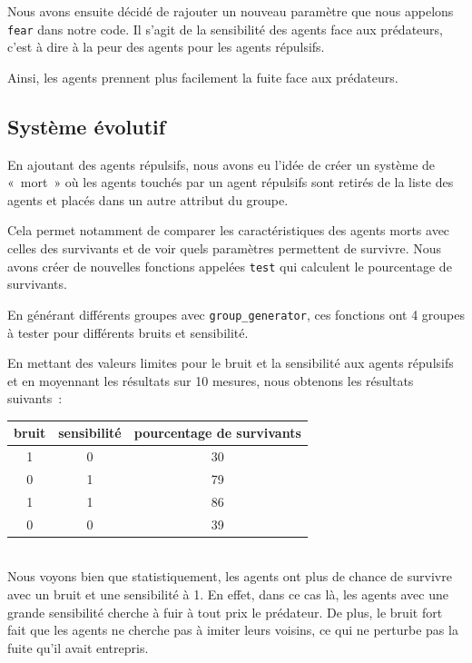 \documentclass[french, a4paper, 12pt, openany]{report}
\begin{document}
   Nous avons ensuite décidé de rajouter un nouveau paramètre que nous appelons \verb|fear| dans notre code. Il s'agit de la sensibilité des agents face aux prédateurs, c'est à dire à la peur des agents pour les agents répulsifs. 
   
   Ainsi, les agents prennent plus facilement la fuite face aux prédateurs.      
   

	\subsection{Système évolutif}
	
		En ajoutant des agents répulsifs, nous avons eu l'idée de créer un système de «~mort~» où les agents touchés par un agent répulsifs sont retirés de la liste des agents et placés dans un autre attribut du groupe.
		
      Cela permet notamment de comparer les caractéristiques des agents morts avec celles des survivants et de voir quels paramètres permettent de survivre. Nous avons créer de nouvelles fonctions appelées \verb|test| qui calculent le pourcentage de survivants. 
     
     En générant différents groupes avec \verb|group_generator|, ces fonctions ont 4 groupes à tester pour différents bruits et sensibilité. 
     
     En mettant des valeurs limites pour le bruit et la sensibilité aux agents répulsifs et en moyennant les résultats sur 10 mesures, nous obtenons les résultats suivants~:\\
		
		\begin{tabular}{|c|c|c|} \hline
		\centering
			bruit & sensibilité & pourcentage de survivants \\ \hline
			1 & 0 & 30 \\ \hline
			0 & 1 & 79 \\ \hline
			1 & 1 & 86 \\ \hline
			0 & 0 & 39 \\ \hline
		\end{tabular}\\

   Nous voyons bien que statistiquement, les agents ont plus de chance de survivre avec un bruit et une sensibilité à 1. En effet, dans ce cas là, les agents avec une grande sensibilité cherche à fuir à tout prix le prédateur. De plus, le bruit fort fait que les agents ne cherche pas à imiter leurs voisins, ce qui ne perturbe pas la fuite qu'il avait entrepris.
   
\end{document}
